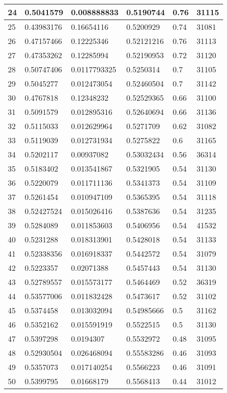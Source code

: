 \begin{longtable}{|l|l|l|l|l|l|}
24 & 0.5041579 & 0.008888833 & 0.5190744 & 0.76 & 31115 \\ \hline 
25 & 0.43983176 & 0.16654116 & 0.5200929 & 0.74 & 31081 \\ \hline 
26 & 0.47157466 & 0.12225346 & 0.52121216 & 0.76 & 31113 \\ \hline 
27 & 0.47353262 & 0.12285994 & 0.52190953 & 0.72 & 31120 \\ \hline 
28 & 0.50747406 & 0.0117793325 & 0.5250314 & 0.7 & 31105 \\ \hline 
29 & 0.5045277 & 0.012473054 & 0.52460504 & 0.7 & 31142 \\ \hline 
30 & 0.4767818 & 0.12348232 & 0.52529365 & 0.66 & 31100 \\ \hline 
31 & 0.5091579 & 0.012895316 & 0.52640694 & 0.66 & 31136 \\ \hline 
32 & 0.5115033 & 0.012629964 & 0.5271709 & 0.62 & 31082 \\ \hline 
33 & 0.5119039 & 0.012731934 & 0.5275822 & 0.6 & 31165 \\ \hline 
34 & 0.5202117 & 0.00937082 & 0.53032434 & 0.56 & 36314 \\ \hline 
35 & 0.5183402 & 0.013541867 & 0.5321905 & 0.54 & 31130 \\ \hline 
36 & 0.5220079 & 0.011711136 & 0.5341373 & 0.54 & 31109 \\ \hline 
37 & 0.5261454 & 0.010947109 & 0.5365395 & 0.54 & 31118 \\ \hline 
38 & 0.52427524 & 0.015026416 & 0.5387636 & 0.54 & 31235 \\ \hline 
39 & 0.5284089 & 0.011853603 & 0.5406956 & 0.54 & 41532 \\ \hline 
40 & 0.5231288 & 0.018313901 & 0.5428018 & 0.54 & 31133 \\ \hline 
41 & 0.52338356 & 0.016918337 & 0.5442572 & 0.54 & 31079 \\ \hline 
42 & 0.5223357 & 0.02071388 & 0.5457443 & 0.54 & 31130 \\ \hline 
43 & 0.52789557 & 0.015573177 & 0.5464469 & 0.52 & 36319 \\ \hline 
44 & 0.53577006 & 0.011832428 & 0.5473617 & 0.52 & 31102 \\ \hline 
45 & 0.5374458 & 0.013032094 & 0.54985666 & 0.5 & 31162 \\ \hline 
46 & 0.5352162 & 0.015591919 & 0.5522515 & 0.5 & 31130 \\ \hline 
47 & 0.5397298 & 0.0194307 & 0.5532972 & 0.48 & 31095 \\ \hline 
48 & 0.52930504 & 0.026468094 & 0.55583286 & 0.46 & 31093 \\ \hline 
49 & 0.5357073 & 0.017140254 & 0.5566223 & 0.46 & 31091 \\ \hline 
50 & 0.5399795 & 0.01668179 & 0.5568413 & 0.44 & 31012 \\ \hline 
\end{longtable}